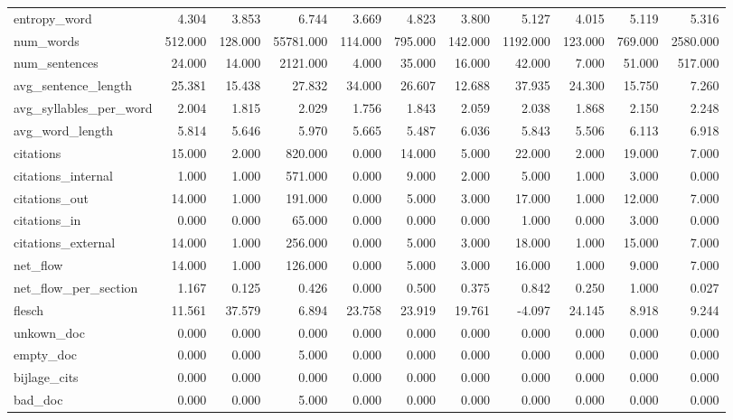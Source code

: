 \begin{tabular}{lrrrrrrrrrr}
\cline{1-11}
entropy\_word & 4.304 & 3.853 & 6.744 & 3.669 & 4.823 & 3.800 & 5.127 & 4.015 & 5.119 & 5.316 \\
\cline{1-11}
num\_words & 512.000 & 128.000 & 55781.000 & 114.000 & 795.000 & 142.000 & 1192.000 & 123.000 & 769.000 & 2580.000 \\
\cline{1-11}
num\_sentences & 24.000 & 14.000 & 2121.000 & 4.000 & 35.000 & 16.000 & 42.000 & 7.000 & 51.000 & 517.000 \\
\cline{1-11}
avg\_sentence\_length & 25.381 & 15.438 & 27.832 & 34.000 & 26.607 & 12.688 & 37.935 & 24.300 & 15.750 & 7.260 \\
\cline{1-11}
avg\_syllables\_per\_word & 2.004 & 1.815 & 2.029 & 1.756 & 1.843 & 2.059 & 2.038 & 1.868 & 2.150 & 2.248 \\
\cline{1-11}
avg\_word\_length & 5.814 & 5.646 & 5.970 & 5.665 & 5.487 & 6.036 & 5.843 & 5.506 & 6.113 & 6.918 \\
\cline{1-11}
citations & 15.000 & 2.000 & 820.000 & 0.000 & 14.000 & 5.000 & 22.000 & 2.000 & 19.000 & 7.000 \\
\cline{1-11}
citations\_internal & 1.000 & 1.000 & 571.000 & 0.000 & 9.000 & 2.000 & 5.000 & 1.000 & 3.000 & 0.000 \\
\cline{1-11}
citations\_out & 14.000 & 1.000 & 191.000 & 0.000 & 5.000 & 3.000 & 17.000 & 1.000 & 12.000 & 7.000 \\
\cline{1-11}
citations\_in & 0.000 & 0.000 & 65.000 & 0.000 & 0.000 & 0.000 & 1.000 & 0.000 & 3.000 & 0.000 \\
\cline{1-11}
citations\_external & 14.000 & 1.000 & 256.000 & 0.000 & 5.000 & 3.000 & 18.000 & 1.000 & 15.000 & 7.000 \\
\cline{1-11}
net\_flow & 14.000 & 1.000 & 126.000 & 0.000 & 5.000 & 3.000 & 16.000 & 1.000 & 9.000 & 7.000 \\
\cline{1-11}
net\_flow\_per\_section & 1.167 & 0.125 & 0.426 & 0.000 & 0.500 & 0.375 & 0.842 & 0.250 & 1.000 & 0.027 \\
\cline{1-11}
flesch & 11.561 & 37.579 & 6.894 & 23.758 & 23.919 & 19.761 & -4.097 & 24.145 & 8.918 & 9.244 \\
\cline{1-11}
unkown\_doc & 0.000 & 0.000 & 0.000 & 0.000 & 0.000 & 0.000 & 0.000 & 0.000 & 0.000 & 0.000 \\
\cline{1-11}
empty\_doc & 0.000 & 0.000 & 5.000 & 0.000 & 0.000 & 0.000 & 0.000 & 0.000 & 0.000 & 0.000 \\
\cline{1-11}
bijlage\_cits & 0.000 & 0.000 & 0.000 & 0.000 & 0.000 & 0.000 & 0.000 & 0.000 & 0.000 & 0.000 \\
\cline{1-11}
bad\_doc & 0.000 & 0.000 & 5.000 & 0.000 & 0.000 & 0.000 & 0.000 & 0.000 & 0.000 & 0.000 \\
\cline{1-11}
\bottomrule
\end{tabular}

